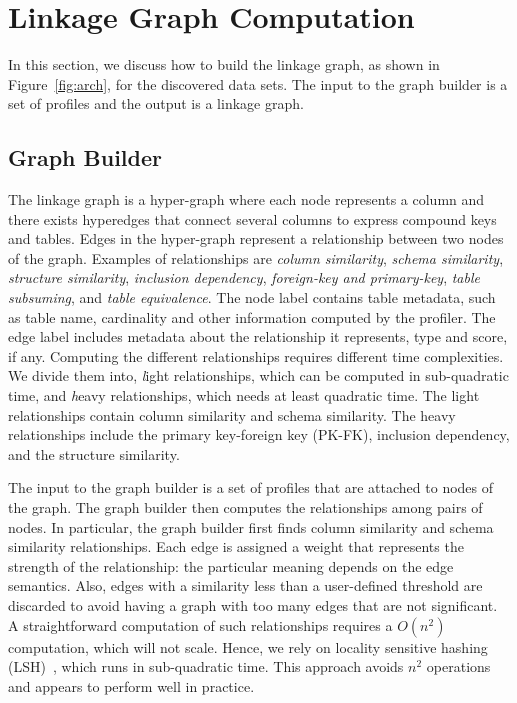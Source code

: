 \section{Linkage Graph Computation}
\label{sec:stitching}
In this section, we discuss how to build the linkage graph, as shown in
Figure~\ref{fig:arch}, for the discovered data sets. The input to the graph
builder is a set of profiles and the output is a linkage graph.

\subsection{Graph Builder}
\label{subsec:graphbuild}

The linkage graph is a hyper-graph
where each node represents a column and there exists hyperedges that connect
several columns to express compound keys and tables. Edges in the hyper-graph
represent a relationship between two nodes of the graph. Examples of relationships are 
\emph{column similarity}, 
\emph{schema similarity}, 
\emph{structure similarity}, %
\emph{inclusion dependency}, 
\emph{foreign-key and primary-key}, 
\emph{table subsuming}, and 
\emph{table equivalence}. 
The node label contains table metadata, such as table name, cardinality and
other information computed by the profiler. The edge label includes metadata
about the relationship it represents, \eg type and score, if any. Computing
the different relationships requires different time complexities. We 
divide them into, {\textit light relationships}, which can be computed in
sub-quadratic time, and {\textit heavy relationships}, which needs at least
quadratic time. The light relationships contain column similarity and schema
similarity. The heavy relationships include the primary key-foreign key
(PK-FK), inclusion dependency, and the structure similarity. 

The input to the graph builder is a set of profiles that are attached to nodes
of the graph.  The graph builder then computes the relationships among pairs of
nodes. In particular, the graph builder first finds column similarity and
schema similarity relationships.  Each edge is assigned a weight that represents
the strength of the relationship: the particular meaning depends on the edge
semantics.  Also, edges with a similarity less than a user-defined threshold are
discarded to avoid having a graph with too many edges that are not significant.
A straightforward computation of such relationships requires a $O(n^2)$
computation, which will not scale.  Hence, we rely on locality sensitive hashing
(LSH)~\cite{DBLP:conf/compgeom/DatarIIM04}, which runs in sub-quadratic time.
This approach avoids $n^2$ operations and appears to perform well in practice.

